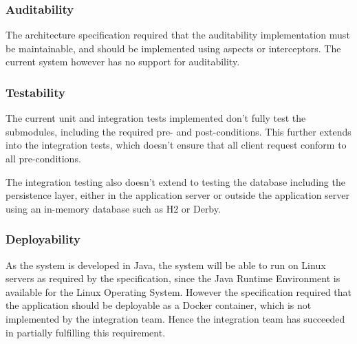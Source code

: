 \documentclass[a4paper,10pt]{article}
\begin{document}
\subsubsection{Auditability}
The architecture specification required that the auditability implementation must be maintainable, and should be implemented using aspects or interceptors. The current system however has no support for auditability.

\subsubsection{Testability}
The current unit and integration tests implemented don't fully test the submodules, including the required pre- and post-conditions.  This further extends into the integration tests, which doesn't ensure that all client request conform to all pre-conditions.

The integration testing also doesn't extend to testing the database including the persistence layer, either in the application server or outside the application server using an in-memory database such as H2 or Derby.

\subsubsection{Deployability}
As the system is developed in Java, the system will be able to run on Linux servers as required by the specification, since the Java Runtime Environment is available for the Linux Operating System.  However the specification required that the application should be deployable as a Docker container,
which is not implemented by the integration team.  Hence the integration team has succeeded in partially fulfilling this requirement.
\end{document}
